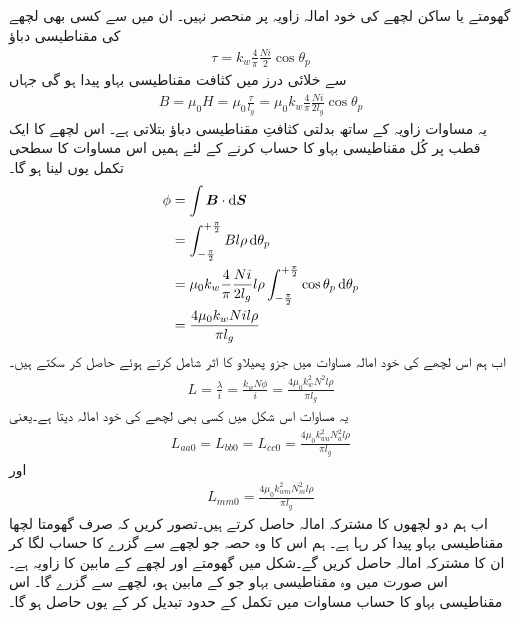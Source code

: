 گھومتے یا ساکن لچھے کی خود امالہ  زاویہ  پر منحصر نہیں۔ ان میں سے کسی بھی لچھے کی مقناطیسی دباؤ  
\begin{align}
\tau=k_w \frac{4}{\pi}\frac{N i}{2} \cos \theta_p
\end{align}
سے خلائی درز میں کثافت مقناطیسی بہاو   پیدا ہو گی جہاں	
\begin{align}
B=\mu_0 H=\mu_0 \frac{\tau}{l_g}=\mu_0 k_w \frac{4}{\pi}\frac{N i}{2 l_g} \cos \theta_p
\end{align}
یہ مساوات زاویہ  کے ساتھ بدلتی کثافتِ مقناطیسی دباؤ  بتلاتی ہے۔ اس لچھے کا ایک قطب پر  کُل مقناطیسی بہاو  کا حساب کرنے کے لئے ہمیں اس مساوات کا سطحی تکمل یوں لینا ہو گا۔
\begin{gather}
\begin{aligned}\label{مساوات_معاصر_بہاو_بذریع_سطحی_تکمل}
\phi&=\int \kvec{B} \cdot \dif \kvec{S}\\
&=\int_{-\frac{\pi}{2}}^{+\frac{\pi}{2}} B l \rho \dif \theta_p\\
&=\mu_0 k_w \frac{4}{\pi}\frac{N i}{2 l_g} l \rho \int_{-\frac{\pi}{2}}^{+\frac{\pi}{2}}  \cos  \theta_p \dif \theta_p\\
&=\frac{4 \mu_0 k_w N i l \rho}{\pi l_g}
\end{aligned}
\end{gather}
اب ہم اس لچھے کی خود امالہ  مساوات  میں جزو پھیلاو  کا اثر شامل کرتے ہوئے  حاصل کر سکتے ہیں۔
\begin{align}
L=\frac{\lambda}{i}=\frac{k_w N \phi}{i}=\frac{4 \mu_0 k_w^2 N^2  l \rho}{\pi l_g}
\end{align}
یہ مساوات اس شکل میں کسی بھی لچھے کی خود امالہ دیتا ہے۔یعنی
\begin{align}\label{مساوات_معاصر_تین_ساکن_امالہ_برابر}
L_{aa0}=L_{bb0}=L_{cc0}=\frac{4 \mu_0 k_{wa}^2 N_a^2  l \rho}{\pi l_g}
\end{align}
اور
\begin{align}
L_{mm0}=\frac{4 \mu_0 k_{wm}^2 N_m^2  l \rho}{\pi l_g}
\end{align}
اب ہم دو لچھوں کا مشترکہ امالہ حاصل کرتے ہیں۔تصور کریں کہ صرف  گھومتا لچھا مقناطیسی بہاو پیدا کر رہا ہے۔ ہم اس کا وہ حصہ جو  لچھے  سے گزرے کا حساب لگا کر ان کا مشترکہ امالہ حاصل کریں گے۔شکل   میں گھومتے اور  لچھے کے مابین کا زاویہ  ہے۔اس صورت میں وہ مقناطیسی بہاو جو  کے مابین ہو،  لچھے سے گزرے گا۔ اس مقناطیسی بہاو کا حساب مساوات   میں تکمل کے حدود تبدیل کر کے یوں حاصل ہو گا۔
